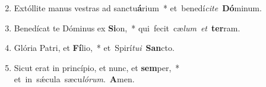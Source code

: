 \begin{flushleft}
\begin{enumerate}[leftmargin=*]
\setcounter{enumi}{1}
\item Extóllite manus vestras ad sanctu\textbf{á}rium~* \mbox{et benedí{\it ci}{\it te} \textbf{Dó}minum.}
\item Benedícat te Dóminus ex \textbf{Si}on,~* \mbox{qui fecit cæ{\it lum} {\it et} \textbf{ter}ram.}
\item Glória Patri, et \textbf{Fí}lio,~* \mbox{et Spirí{\it tu}{\it i} \textbf{San}cto.}
\item Sicut erat in princípio, et nunc, et \textbf{sem}per,~* \mbox{et in s\'{\ae}cula sæcu{\it ló}{\it rum}. \textbf{A}men.}
\end{enumerate}
\end{flushleft}

